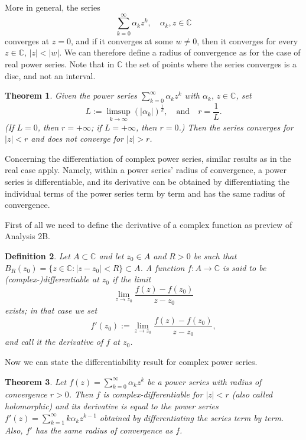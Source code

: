 \documentclass[a4paper,reqno]{amsart}
\numberwithin{equation}{section}
\newtheorem{definition}{Definition}[section]
\newtheorem{theorem}[definition]{Theorem}
\def\C{\mathbb{C}}
\begin{document}
\bigskip

More in general, the series
$$
\sum_{k=0}^\infty \alpha_k z^k, \quad \alpha_k, z\in \C
$$
converges at $z=0$, and if it converges at some $w\neq 0$, then it converges for every $z\in \C$, $|z|<|w|$.
We can therefore define a radius of convergence as for the case of real power series. Note that in $\C$ the set of points
where the series converges is a disc, and not an interval.

\begin{theorem}
Given the power series $\sum_{k=0}^\infty \alpha_k z^k$ with $\alpha_k, \,z\in \C$, set
$$
L:= \limsup_{k\to \infty} (|\alpha_k|)^{\frac1k}, \quad \textrm{and} \quad r=\frac1L.
$$
(If $L=0$, then $r=+\infty$; if $L=+\infty$, then $r=0$.) Then the series converges for $|z|<r$ and does not converge for $|z|>r$.
\end{theorem}


\medskip

Concerning the differentiation of complex power series, similar results as in the real case apply. Namely, within a power series' radius of convergence, a power series is differentiable, and its derivative can be obtained by differentiating the individual terms of the power series term by term and has the same radius of convergence.

\smallskip

First of all we need to define the derivative of a complex function as preview of Analysis 2B.

\begin{definition}
Let $A\subset \C$ and let $z_0\in A$ and $R>0$ be such that $B_R(z_0)=\{z\in \C: |z-z_0|<R\}\subset A$. A function $f:A\to \C$ is said to be (complex-)differentiable at $z_0$ if the limit
$$
\lim_{z\to z_0}\frac{f(z)-f(z_0)}{z-z_0}
$$
exists; in that case we set
$$
f'(z_0):= \lim_{z\to z_0}\frac{f(z)-f(z_0)}{z-z_0},
$$
and call it the derivative of $f$ at $z_0$.
\end{definition}

Now we can state the differentiability result for complex power series.

\begin{theorem}
Let $f(z)=\sum_{k=0}^\infty \alpha_k z^k$ be a power series with radius of convergence $r>0$. Then $f$ is complex-differentiable for $|z|<r$ (also called holomorphic) and its derivative is equal to the power series
$f'(z) = \sum_{k=1}^\infty k \alpha_k z^{k-1}$ obtained by differentiating the series term by term. Also, $f'$ has the same radius of convergence as $f$.
\end{theorem}
\end{document}
